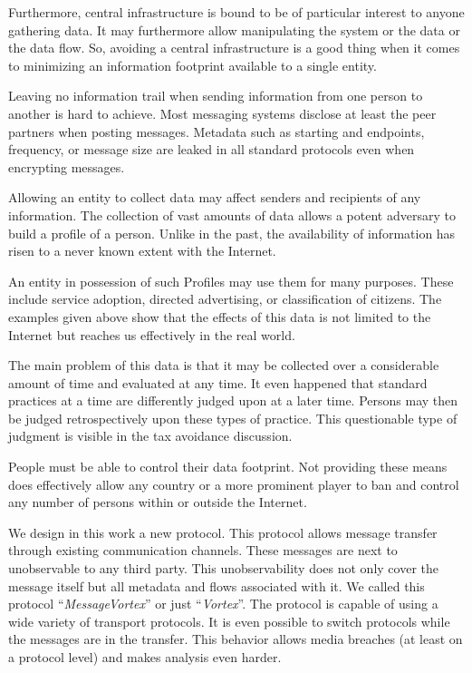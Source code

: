 Furthermore, central infrastructure is bound to be of particular interest to anyone gathering data. It may furthermore allow manipulating the system or the data or the data flow. So, avoiding a central infrastructure is a good thing when it comes to minimizing an information footprint available to a single entity.

Leaving no information trail when sending information from one person to another is hard to achieve. Most messaging systems disclose at least the peer partners when posting messages. Metadata such as starting and endpoints, frequency, or message size are leaked in all standard protocols even when encrypting messages.

Allowing an entity to collect data may affect senders and recipients of any information. The collection of vast amounts of data allows a potent adversary to build a  profile of a person. Unlike in the past, the availability of information has risen to a never known extent with the Internet.

An entity in possession of such Profiles may use them for many purposes. These include service adoption, directed advertising, or classification of citizens. The examples given above show that the effects of this data is not limited to the Internet but reaches us effectively in the real world.

The main problem of this data is that it may be collected over a considerable amount of time and evaluated at any time. It even happened that standard practices at a time are differently judged upon at a later time. Persons may then be judged retrospectively upon these types of practice. This questionable type of judgment is visible in the tax avoidance discussion\cite{Amat1999}. 

People must be able to control their data footprint. Not providing these means does effectively allow any country or a more prominent player to ban and control any number of persons within or outside the Internet. 

We design in this work a new protocol. This protocol allows message transfer through existing communication channels. These messages are next to unobservable to any third party. This unobservability does not only cover the message itself but all metadata and flows associated with it. We called this protocol ``\emph{MessageVortex}'' or just ``\emph{Vortex}''. The protocol is capable of using a wide variety of transport protocols. It is even possible to switch protocols while the messages are in the transfer. This behavior allows media breaches (at least on a protocol level) and makes analysis even harder.

